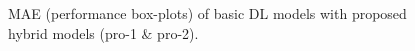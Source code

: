 \documentclass[a4paper, fleqn]{cas-sc}
\begin{document}
\begin{figure}[h!]
    \caption{MAE (performance box-plots) of basic DL models with proposed hybrid models (pro-1 \& pro-2).}
    \label{Fig:16}
  \end{figure}
\end{document}
